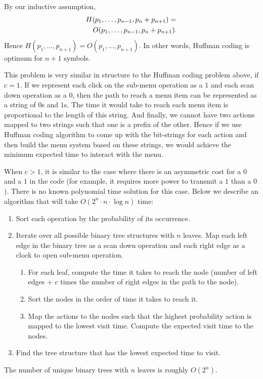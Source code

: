 By our inductive assumption, 
{
\begin{eqnarray*}
\lefteqn{ H(p_1,\ldots, p_{n-1}, p_n + p_{n+1}) = } \\
 & & O(p_1,\ldots, p_{n-1}, p_n + p_{n+1}).
\end{eqnarray*}
}
Hence $H(p_1,\ldots,
p_{n+1}) = O(p_1,\ldots, p_{n+1})$. In other words, Huffman coding
is optimum for $n+1$ symbols.

This problem is very similar in structure to the Huffman coding
problem above, if $c =1$. If we represent each click on the sub-menu
operation as a $1$ and each scan down operation as a $0$, then the path
to reach a menu item can be represented as a string of $0$s and $1$s.
The time it would take to reach each menu item is proportional to the
length of this string. And finally, we cannot have two actions mapped
to two strings such that one is a prefix of the other. Hence if we
use Huffman coding algorithm to come up with the bit-strings for each
action and then build the menu system based on these strings, we would
achieve the minimum expected time to interact with the menu.

When $c > 1$, it is similar to the case where there is an asymmetric cost
for a $0$ and a $1$ in the code (for example, it requires more power
to transmit a $1$ than a $0$). There is no known polynomial time
solution for this case. Below we describe an algorithm that will take $O(2^n \cdot n \cdot \log n)$ time:
\begin{enumerate} 
\itemsep 1pt
\item Sort each operation by the probability of its occurrence.
\item Iterate over all possible binary tree structures with
  $n$ leaves. Map each left edge in the binary tree as a scan down
  operation and each right edge as a clock to open sub-menu operation.
\begin{enumerate}
\item For each leaf, compute the time it takes to reach the node
  (number of left edges + $c$ times the number of right edges in the path to the node).
\item Sort the nodes in the order of time it takes to reach it.
\item Map the actions to the nodes such that the highest probability
  action is mapped to the lowest visit time. Compute the expected visit
  time to the nodes.
\end{enumerate}
\item Find the tree structure that has the lowest expected time to
  visit.
\end{enumerate}
The number of unique binary trees with $n$ leaves is roughly $O(2^n)$.
 
